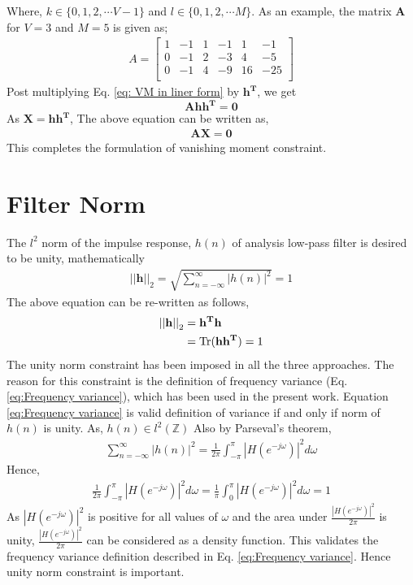 Where, $k \in \{0,1,2, \cdots V-1\}$ and $l \in \{0,1,2,\cdots M\}$.
As an example, the matrix $\mathbf{A}$ for $V=3$ and $M=5$ is given as;
\begin{eqnarray}
\label{eq: Matrix A for V=3 and M=5}
A = \left[
\begin{array}{ccccccc}
    1     & -1    & 1     & -1    & 1     & -1 \\
    0     & -1    & 2     & -3    & 4     & -5 \\
    0     & -1    & 4     & -9    & 16    & -25 \\
\end{array}
\right]
\end{eqnarray}
Post multiplying Eq. \ref{eq: VM in liner form} by $\mathbf{h^T}$, we get
$$ \mathbf{Ah{h^T}=0}$$
As $ \mathbf{X = h{h^T}}$, The above equation can be written as,
\begin{eqnarray}
\label{eq: VM in SDP form}
\mathbf{AX = 0}
\end{eqnarray}
This completes the formulation of vanishing moment constraint.
\section{Filter Norm}
\label{sec: Filter Norm}
The $l^2$ norm of the impulse response, $h(n)$ of analysis low-pass filter is desired to be unity, mathematically 
\begin{eqnarray}
\label{eq: l2 norm}
 {||\mathbf{h}||}_2 = \sqrt{\sum_{n=-\infty}^{\infty}|h(n)|^2} = 1 
\end{eqnarray}
The above equation can be re-written as follows,
\begin{eqnarray}
\label{eq: l2 norm SDP form}
\begin{aligned}
{||\mathbf{h}||}_2 &= \mathbf{h^Th}\\ &= \operatorname{Tr}(\mathbf{hh^T}) = 1
\end{aligned}
\end{eqnarray}
The unity norm constraint has been imposed in all the three approaches. The reason for this constraint is the definition of frequency variance (Eq. \ref{eq:Frequency variance}), which has been used in the present work. Equation \ref{eq:Frequency variance} is valid definition of variance if and only if norm of $h(n)$ is unity. 
As, $h(n) \in l^2(\mathbb{Z})$
Also by Parseval's theorem,
\begin{eqnarray}
\label{eq: parsevals identity}
\sum_{n=-\infty}^{\infty}|h(n)|^2 = \frac{1}{2\pi}\int_{-\pi}^{\pi}|H(e^{-j\omega})|^2 d\omega
\end{eqnarray}
Hence,
\begin{eqnarray}
\frac{1}{2\pi}\int_{-\pi}^{\pi}|H(e^{-j\omega})|^2 d\omega = \frac{1}{\pi}\int_{0}^{\pi}|H(e^{-j\omega})|^2 d\omega = 1
\end{eqnarray}
As $|H(e^{-j\omega})|^2$ is positive for all values of $\omega$ and the area under $\frac{|H(e^{-j\omega})|^2}{2\pi}$ is unity, $\frac{|H(e^{-j\omega})|^2}{2\pi}$ can be considered as a density function. This validates the frequency variance definition described in Eq. \ref{eq:Frequency variance}. Hence unity norm constraint is important.

